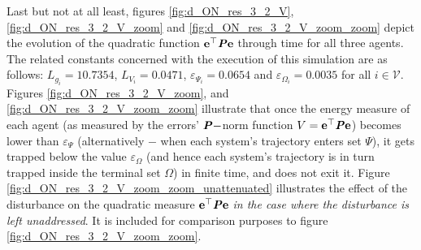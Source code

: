 Last but not at all least, figures
\eqref{fig:d_ON_res_3_2_V}, \eqref{fig:d_ON_res_3_2_V_zoom} and
\eqref{fig:d_ON_res_3_2_V_zoom_zoom} depict
the evolution of the quadratic function
$\bm{\mathbf{e}}^{\top} \bm{\mathit{P}} \bm{\mathbf{e}}$ through time for all three agents.
The related constants concerned with the execution
of this simulation are as follows: $L_{g_i} = 10.7354$, $L_{V_i} = 0.0471$,
$\varepsilon_{\Psi_i} = 0.0654$ and $\varepsilon_{\Omega_i} = 0.0035$ for
all $i \in \mathcal{V}$. Figures \eqref{fig:d_ON_res_3_2_V_zoom},
and \eqref{fig:d_ON_res_3_2_V_zoom_zoom}
illustrate that once the energy measure of each agent (as measured by
the errors' $\bm{\mathit{P}}-$norm function $V = \bm{\mathbf{e}}^{\top} \bm{\mathit{P}} \bm{\mathbf{e}}$)
becomes lower than $\varepsilon_{\Psi}$ (alternatively $-$ when each system's
trajectory enters set $\Psi$), it gets trapped below the value
$\varepsilon_{\Omega}$ (and hence each system's trajectory is in turn trapped
inside the terminal set $\Omega$) in finite time, and does not exit it.
Figure \eqref{fig:d_ON_res_3_2_V_zoom_zoom_unattenuated} illustrates the
effect of the disturbance on the quadratic measure
$\bm{\mathbf{e}}^{\top} \bm{\mathit{P}} \bm{\mathbf{e}}$ \textit{in the case where the disturbance is
left unaddressed}. It is included for comparison purposes to figure
\eqref{fig:d_ON_res_3_2_V_zoom_zoom}.


\noindent{}\\[2.5ex]

